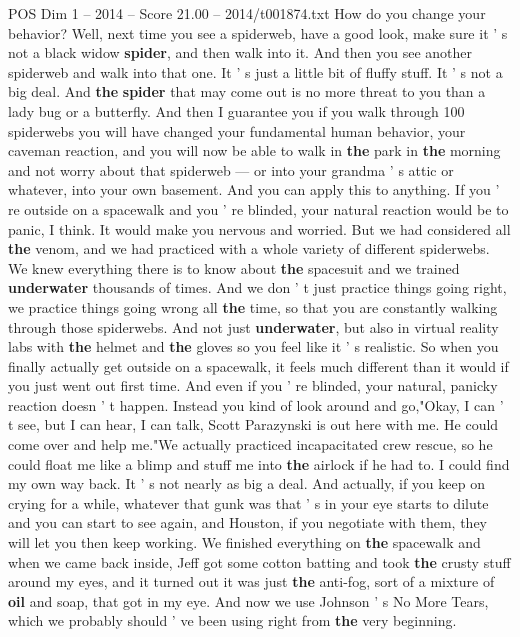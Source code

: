 \begin{textsample}{POS Dim 1 – 2014 – Score 21.00 – 2014/t001874.txt}
How do you change your behavior?
Well, next time you see a spiderweb, have a good look, make sure it ' s not a black widow \textbf{spider}, and then walk into it.
And then you see another spiderweb and walk into that one.
It ' s just a little bit of fluffy stuff.
It ' s not a big deal.
And \textbf{the} \textbf{spider} that may come out is no more threat to you than a lady bug or a butterfly.
And then I guarantee you if you walk through 100 spiderwebs you will have changed your fundamental human behavior, your caveman reaction, and you will now be able to walk in \textbf{the} park in \textbf{the} morning and not worry about that spiderweb — or into your grandma ' s attic or whatever, into your own basement.
And you can apply this to anything.
If you ' re outside on a spacewalk and you ' re blinded, your natural reaction would be to panic, I think.
It would make you nervous and worried.
But we had considered all \textbf{the} venom, and we had practiced with a whole variety of different spiderwebs.
We knew everything there is to know about \textbf{the} spacesuit and we trained \textbf{underwater} thousands of times.
And we don ' t just practice things going right, we practice things going wrong all \textbf{the} time, so that you are constantly walking through those spiderwebs.
And not just \textbf{underwater}, but also in virtual reality labs with \textbf{the} helmet and \textbf{the} gloves so you feel like it ' s realistic.
So when you finally actually get outside on a spacewalk, it feels much different than it would if you just went out first time.
And even if you ' re blinded, your natural, panicky reaction doesn ' t happen.
Instead you kind of look around and go,"Okay, I can ' t see, but I can hear, I can talk, Scott Parazynski is out here with me.
He could come over and help me."We actually practiced incapacitated crew rescue, so he could float me like a blimp and stuff me into \textbf{the} airlock if he had to.
I could find my own way back.
It ' s not nearly as big a deal.
And actually, if you keep on crying for a while, whatever that gunk was that ' s in your eye starts to dilute and you can start to see again, and Houston, if you negotiate with them, they will let you then keep working.
We finished everything on \textbf{the} spacewalk and when we came back inside, Jeff got some cotton batting and took \textbf{the} crusty stuff around my eyes, and it turned out it was just \textbf{the} anti-fog, sort of a mixture of \textbf{oil} and soap, that got in my eye.
And now we use Johnson ' s No More Tears, which we probably should ' ve been using right from \textbf{the} very beginning.

\end{textsample}
